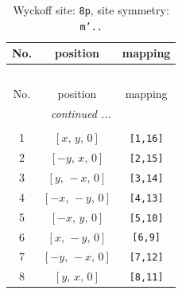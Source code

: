 \documentclass[fleqn,8pt]{jsarticle}
\begin{document}
\renewcommand{\arraystretch}{1.2}
\begin{longtable}{ccc}
\caption{Wyckoff site: {\tt 8p}, site symmetry: {\tt m'..}}
 \\
 \hline \hline
No. & position & mapping \\ \hline \endfirsthead

\multicolumn{2}{l}{\tablename\ \thetable{}} \\
 \hline \hline
No. & position & mapping \\ \hline \endhead

 \hline \hline
\multicolumn{2}{r}{\footnotesize\it continued ...} \\ \endfoot

 \hline \hline
\multicolumn{2}{r}{} \\ \endlastfoot

1 & $\left[ x,\, y,\, 0 \right]$ & {\tt [1,16]} \\ \hline
2 & $\left[ - y,\, x,\, 0 \right]$ & {\tt [2,15]} \\ \hline
3 & $\left[ y,\, - x,\, 0 \right]$ & {\tt [3,14]} \\ \hline
4 & $\left[ - x,\, - y,\, 0 \right]$ & {\tt [4,13]} \\ \hline
5 & $\left[ - x,\, y,\, 0 \right]$ & {\tt [5,10]} \\ \hline
6 & $\left[ x,\, - y,\, 0 \right]$ & {\tt [6,9]} \\ \hline
7 & $\left[ - y,\, - x,\, 0 \right]$ & {\tt [7,12]} \\ \hline
8 & $\left[ y,\, x,\, 0 \right]$ & {\tt [8,11]} \\
\end{longtable}
\renewcommand{\arraystretch}{1.2}
\end{document}
